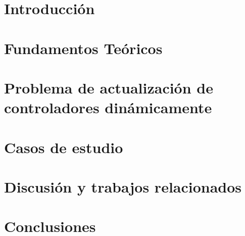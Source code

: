\chapter{Introducción}







\chapter{Fundamentos Teóricos}















\chapter{Problema de actualización de controladores dinámicamente}

\chapter{Casos de estudio}

\chapter{Discusión y trabajos relacionados}

\chapter{Conclusiones}







